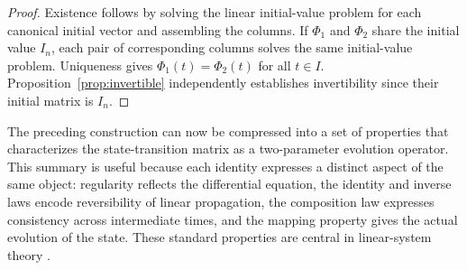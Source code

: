 \documentclass[11pt,a4paper]{article}
\theoremstyle{definition}
\numberwithin{equation}{section}
\begin{document}
\begin{proof}
Existence follows by solving the linear initial-value problem for each canonical initial vector and assembling the columns. If $\Phi_1$ and $\Phi_2$ share the initial value $I_n$, each pair of corresponding columns solves the same initial-value problem. Uniqueness gives $\Phi_1(t)=\Phi_2(t)$ for all $t\in I$. Proposition~\ref{prop:invertible} independently establishes invertibility since their initial matrix is $I_n$.
\end{proof}

The preceding construction can now be compressed into a set of properties that characterizes the state-transition matrix as a two-parameter evolution operator. This summary is useful because each identity expresses a distinct aspect of the same object: regularity reflects the differential equation, the identity and inverse laws encode reversibility of linear propagation, the composition law expresses consistency across intermediate times, and the mapping property gives the actual evolution of the state. These standard properties are central in linear-system theory \cite{rugh1996,brockett1970}.
\end{document}
